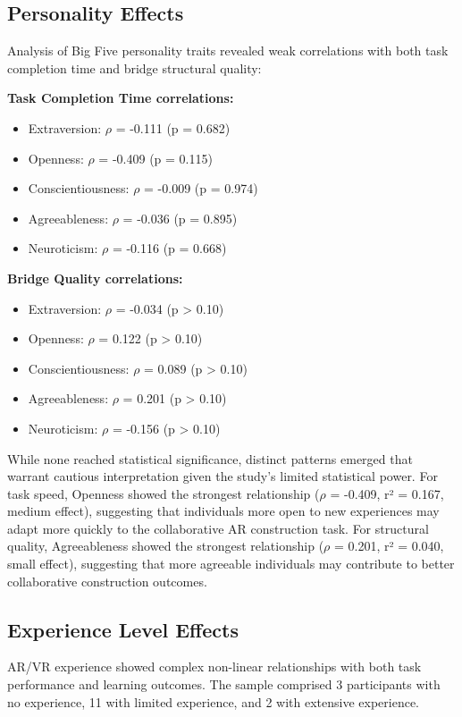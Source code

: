 \subsection{Personality Effects}

Analysis of Big Five personality traits revealed weak correlations with both task completion time and bridge structural quality:

\textbf{Task Completion Time correlations:}
\begin{itemize}
\item Extraversion: $\rho$ = -0.111 (p = 0.682)
\item Openness: $\rho$ = -0.409 (p = 0.115)
\item Conscientiousness: $\rho$ = -0.009 (p = 0.974)
\item Agreeableness: $\rho$ = -0.036 (p = 0.895)
\item Neuroticism: $\rho$ = -0.116 (p = 0.668)
\end{itemize}

\textbf{Bridge Quality correlations:}
\begin{itemize}
\item Extraversion: $\rho$ = -0.034 (p > 0.10)
\item Openness: $\rho$ = 0.122 (p > 0.10)
\item Conscientiousness: $\rho$ = 0.089 (p > 0.10)
\item Agreeableness: $\rho$ = 0.201 (p > 0.10)
\item Neuroticism: $\rho$ = -0.156 (p > 0.10)
\end{itemize}

While none reached statistical significance, distinct patterns emerged that warrant cautious interpretation given the study's limited statistical power. For task speed, Openness showed the strongest relationship ($\rho$ = -0.409, r² = 0.167, medium effect), suggesting that individuals more open to new experiences may adapt more quickly to the collaborative AR construction task. For structural quality, Agreeableness showed the strongest relationship ($\rho$ = 0.201, r² = 0.040, small effect), suggesting that more agreeable individuals may contribute to better collaborative construction outcomes.

\subsection{Experience Level Effects}

AR/VR experience showed complex non-linear relationships with both task performance and learning outcomes. The sample comprised 3 participants with no experience, 11 with limited experience, and 2 with extensive experience.

